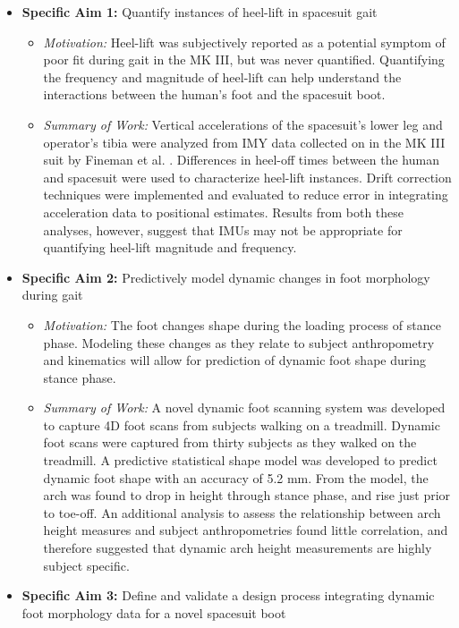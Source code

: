 \documentclass[defaultstyle,11pt]{comps}
\providecommand{\tightlist}{%
  \setlength{\itemsep}{0pt}\setlength{\parskip}{0pt}}
\begin{document}
\begin{itemize}
\tightlist
\item
  \textbf{Specific Aim 1:} Quantify instances of heel-lift in spacesuit gait

  \begin{itemize}
  \tightlist
  \item
    \emph{Motivation:} Heel-lift was subjectively reported as a potential symptom of poor fit during gait in the MK III, but was never quantified.
    Quantifying the frequency and magnitude of heel-lift can help understand the interactions between the human's foot and the spacesuit boot.
  \item
    \emph{Summary of Work:} Vertical accelerations of the spacesuit's lower leg and operator's tibia were analyzed from IMY data collected on in the MK III suit by Fineman et al. \citep{Fineman2018}.
    Differences in heel-off times between the human and spacesuit were used to characterize heel-lift instances.
    Drift correction techniques were implemented and evaluated to reduce error in integrating acceleration data to positional estimates. Results from both these analyses, however, suggest that IMUs may not be appropriate for quantifying heel-lift magnitude and frequency.
  \end{itemize}
\item
  \textbf{Specific Aim 2:} Predictively model dynamic changes in foot morphology during gait

  \begin{itemize}
  \tightlist
  \item
    \emph{Motivation:} The foot changes shape during the loading process of stance phase.
    Modeling these changes as they relate to subject anthropometry and kinematics will allow for prediction of dynamic foot shape during stance phase.
  \item
    \emph{Summary of Work:} A novel dynamic foot scanning system was developed to capture 4D foot scans from subjects walking on a treadmill.
    Dynamic foot scans were captured from thirty subjects as they walked on the treadmill.
    A predictive statistical shape model was developed to predict dynamic foot shape with an accuracy of 5.2 mm.
    From the model, the arch was found to drop in height through stance phase, and rise just prior to toe-off.
    An additional analysis to assess the relationship between arch height measures and subject anthropometries found little correlation, and therefore suggested that dynamic arch height measurements are highly subject specific.
  \end{itemize}
\item
  \textbf{Specific Aim 3:} Define and validate a design process integrating dynamic foot morphology data for a novel spacesuit boot


\end{itemize}
\end{document}
